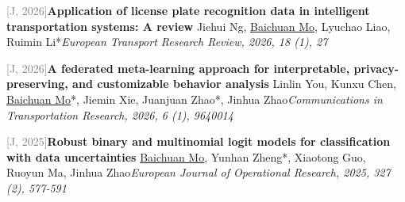 \par\noindent\begin{minipage}{\linewidth}
{\textcolor{gray}{[J\themyCounter, 2026]\;}}{\textbf{Application of license plate recognition data in intelligent transportation systems: A review} \href{https://doi.org/10.1186/s12544-026-00788-3}{\textcolor{cadmiumorange}{\faExternalLink}}}{\newline Jiehui Ng, \underline{Baichuan Mo}, Lyuchao Liao, Ruimin Li*}{\newline \emph{European Transport Research Review, 2026, 18 (1), 27}}{{\;    }}{}
\end{minipage}\par\vspace{5.5pt}


\par\noindent\begin{minipage}{\linewidth}
{\textcolor{gray}{[J\themyCounter, 2026]\;}}{\textbf{A federated meta-learning approach for interpretable, privacy-preserving, and customizable behavior analysis} \href{https://doi.org/10.26599/commtr.2026.9640014}{\textcolor{cadmiumorange}{\faExternalLink}}}{\newline Linlin You, Kunxu Chen, \underline{Baichuan Mo}*, Jiemin Xie, Juanjuan Zhao*, Jinhua Zhao}{\newline \emph{Communications in Transportation Research, 2026, 6 (1), 9640014}}{{\;     }}{}
\end{minipage}\par\vspace{5.5pt}


\par\noindent\begin{minipage}{\linewidth}
{\textcolor{gray}{[J\themyCounter, 2025]\;}}{\textbf{Robust binary and multinomial logit models for classification with data uncertainties} \href{https://doi.org/10.1016/j.ejor.2025.05.013}{\textcolor{cadmiumorange}{\faExternalLink}}}{\newline \underline{Baichuan Mo}, Yunhan Zheng*, Xiaotong Guo, Ruoyun Ma, Jinhua Zhao}{\newline \emph{European Journal of Operational Research, 2025, 327 (2), 577-591}}{{\;    }}{}
\end{minipage}\par\vspace{5.5pt}


